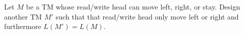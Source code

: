 Let $M$ be a TM whose read/write head can move left, right, or stay.
Design another TM $M'$ such that that read/write head only move left or right
and furthermore $L(M') = L(M)$.
